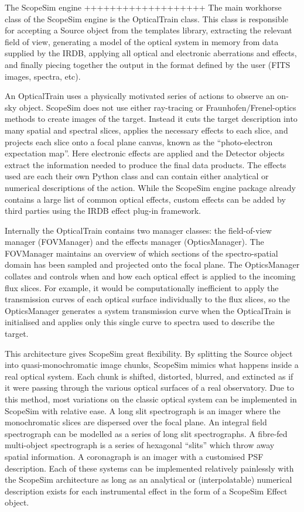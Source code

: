 The ScopeSim engine
+++++++++++++++++++
The main workhorse class of the ScopeSim engine is the OpticalTrain class. This
class is responsible for accepting a Source object from the templates library,
extracting the relevant field of view, generating a model of the optical system
in memory from data supplied by the IRDB, applying all optical and electronic
aberrations and effects, and finally piecing together the output in the format
defined by the user (FITS images, spectra, etc).

An OpticalTrain uses a physically motivated series of actions to observe an
on-sky object. ScopeSim does not use either ray-tracing or
Fraunhofen/Frenel-optics methods to create images of the target. Instead it
cuts the target description into many spatial and spectral slices, applies the
necessary effects to each slice, and projects each slice onto a focal plane
canvas, known as the ``photo-electron expectation map''. Here electronic
effects are applied and the Detector objects extract the information needed to
produce the final data products. The effects used are each their own Python
class and can contain either analytical or numerical descriptions of the action.
While the ScopeSim engine package already contains a large list of common
optical effects, custom effects can be added by third parties using the
IRDB effect plug-in framework.

Internally the OpticalTrain contains two manager classes: the field-of-view
manager (FOVManager) and the effects manager (OpticsManager). The FOVManager
maintains an overview of which sections of the spectro-spatial domain has been
sampled and projected onto the focal plane. The OpticsManager collates and
controls when and how each optical effect is applied to the incoming flux
slices. For example, it would be computationally inefficient to apply the
transmission curves of each optical surface individually to the flux slices, so
the OpticsManager generates a system transmission curve when the OpticalTrain is
initialised and applies only this single curve to spectra used to describe the
target.

This architecture gives ScopeSim great flexibility. By splitting the Source
object into quasi-monochromatic image chunks, ScopeSim mimics what happens
inside a real optical system. Each chunk is shifted, distorted, blurred, and
extincted as if it were passing through the various optical surfaces
of a real observatory. Due to this method, most variations on the classic
optical system can be implemented in ScopeSim with relative ease. A long slit
spectrograph is an imager where the monochromatic slices are dispersed
over the focal plane. An integral field spectrograph can be modelled as a series
of long slit spectrographs. A fibre-fed multi-object spectrograph is a series of
hexagonal ``slits'' which throw away spatial information. A coronagraph is an
imager with a customised PSF description. Each of these systems can be
implemented relatively painlessly with the ScopeSim architecture as long as an
analytical or (interpolatable) numerical description exists for each
instrumental effect in the form of a ScopeSim Effect object.

